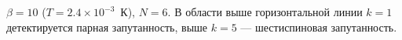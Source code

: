 $\beta=10$ ($T = 2.4\times 10^{-3}$~К), $N=6$.
В области выше горизонтальной линии $k=1$ детектируется парная запутанность, выше $k=5$ --- шестиспиновая запутанность.
